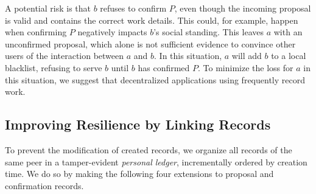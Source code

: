 
A potential risk is that $ b $ refuses to confirm $ P $, even though the incoming proposal is valid and contains the correct work details.
This could, for example, happen when confirming $ P $ negatively impacts $ b $'s social standing.
This leaves $ a $ with an unconfirmed proposal, which alone is not sufficient evidence to convince other users of the interaction between $ a $ and $ b $.
In this situation, $ a $ will add $ b $ to a local blacklist, refusing to serve $ b $ until $ b $ has confirmed $ P $.
To minimize the loss for $ a $ in this situation, we suggest that decentralized applications using \ModelName{} frequently record work.

\subsection{Improving Resilience by Linking Records}
To prevent the modification of created records, we organize all records of the same peer in a tamper-evident \emph{personal ledger}, incrementally ordered by creation time.
We do so by making the following four extensions to proposal and confirmation records.

